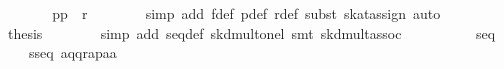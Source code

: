 \begin{isabellebody}
\ \ \ \ \isamarkupfalse%
\ \isamarkupfalse%
\ {}p{}{}{}p{}{}\ {}\ r{}{}{}\isanewline
\ \ \ \ \ \ \isamarkupfalse%
\ {}simp\ add{}\ f{}def\ p{}def\ r{}def{}\ subst\ skat{}assign{}{}\ auto{}\isanewline
\ \ \ \ \isamarkupfalse%
\ \isamarkupfalse%
\ {}thesis\isanewline
\ \ \ \ \ \ \isamarkupfalse%
\ {}simp\ add{}\ seq{}def\ skd{}mult{}onel{}\ {}smt\ skd{}mult{}assoc{}\isanewline
\ \ \isamarkupfalse%
\isanewline
\isanewline
\ \ \isamarkupfalse%
\ \isamarkupfalse%
\ {}{}{}{}\ {}\ seq\isanewline
\ \ \ \ {}s{}{}{}seq\ {}a{}{}q{}{}{}{}q{}{}{}{}r{}{}{}{}{}a{}{}p{}{}{}a{}{}{}a{}{}{}\isanewline

\end{isabellebody}
